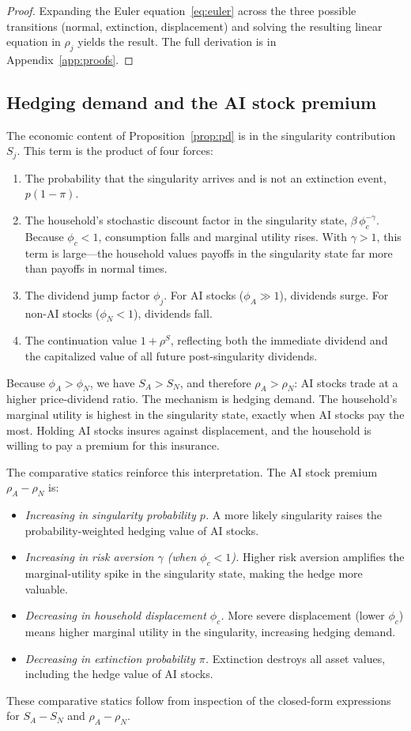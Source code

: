 \documentclass[12pt]{article}
\begin{document}
\begin{proof}
Expanding the Euler equation~\eqref{eq:euler} across the three possible transitions (normal, extinction, displacement) and solving the resulting linear equation in $\rho_j$ yields the result.
The full derivation is in Appendix~\ref{app:proofs}.
\end{proof}

\subsection{Hedging demand and the AI stock premium}

The economic content of Proposition~\ref{prop:pd} is in the singularity contribution $S_j$.
This term is the product of four forces:
\begin{enumerate}
\item The probability that the singularity arrives and is not an extinction event, $p(1-\pi)$.
\item The household's stochastic discount factor in the singularity state, $\beta\,\phi_c^{-\gamma}$.  Because $\phi_c < 1$, consumption falls and marginal utility rises.  With $\gamma > 1$, this term is large---the household values payoffs in the singularity state far more than payoffs in normal times.
\item The dividend jump factor $\phi_j$.  For AI stocks ($\phi_A \gg 1$), dividends surge.  For non-AI stocks ($\phi_N < 1$), dividends fall.
\item The continuation value $1 + \rho^S$, reflecting both the immediate dividend and the capitalized value of all future post-singularity dividends.
\end{enumerate}

Because $\phi_A > \phi_N$, we have $S_A > S_N$, and therefore $\rho_A > \rho_N$: AI stocks trade at a higher price-dividend ratio.
The mechanism is hedging demand.
The household's marginal utility is highest in the singularity state, exactly when AI stocks pay the most.
Holding AI stocks insures against displacement, and the household is willing to pay a premium for this insurance.

The comparative statics reinforce this interpretation.
The AI stock premium $\rho_A - \rho_N$ is:
\begin{itemize}
\item \textit{Increasing in singularity probability $p$.}  A more likely singularity raises the probability-weighted hedging value of AI stocks.
\item \textit{Increasing in risk aversion $\gamma$ (when $\phi_c < 1$).}  Higher risk aversion amplifies the marginal-utility spike in the singularity state, making the hedge more valuable.
\item \textit{Decreasing in household displacement $\phi_c$.}  More severe displacement (lower $\phi_c$) means higher marginal utility in the singularity, increasing hedging demand.
\item \textit{Decreasing in extinction probability $\pi$.}  Extinction destroys all asset values, including the hedge value of AI stocks.
\end{itemize}
These comparative statics follow from inspection of the closed-form expressions for $S_A - S_N$ and $\rho_A - \rho_N$.
\end{document}

